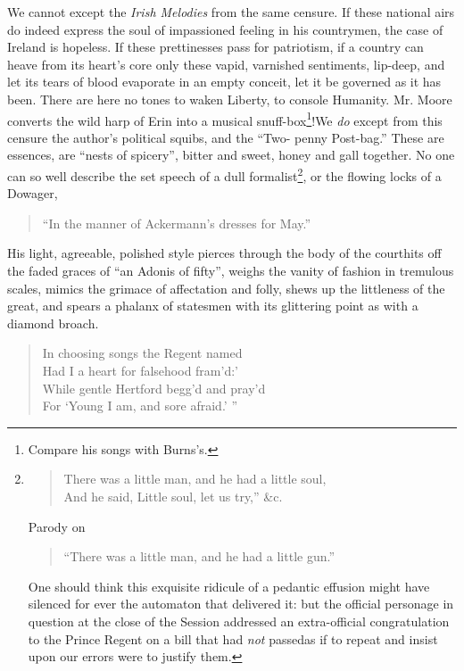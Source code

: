 We cannot except the \emph{Irish Melodies} from the same censure. If these
national airs do indeed express the soul of impassioned feeling in his
countrymen, the case of Ireland is hopeless. If these prettinesses pass
for patriotism, if a country can heave from its heart's core only these
vapid, varnished sentiments, lip-deep, and let its tears of blood
evaporate in an empty conceit, let it be governed as it has been. There
are here no tones to waken Liberty, to console Humanity. Mr. Moore
converts the wild harp of Erin into a musical snuff-box\footnote{Compare his songs with Burns's.}!\textemdash We \emph{do}
except from this censure the author's political squibs, and the ``Two-
penny Post-bag.'' These are essences, are ``nests of spicery'', bitter and
sweet, honey and gall together. No one can so well describe the set
speech of a dull formalist\footnote{\begin{verse}
  There was a little man, and he had a little soul,\\
  And he said, Little soul, let us try,'' \&c.\textemdash 
\end{verse}
Parody on
\begin{verse}
   ``There was a little man, and he had a little gun.''\textemdash 
\end{verse}
One should think this exquisite ridicule of a pedantic effusion might
have silenced for ever the automaton that delivered it: but the
official personage in question at the close of the Session addressed an
extra-official congratulation to the Prince Regent on a bill that had
\emph{not} passed\textemdash as if to repeat and insist upon our errors were to justify
them.}, or the flowing locks of a Dowager,
\begin{verse}
   ``In the manner of Ackermann's dresses for May.''
\end{verse}
His light, agreeable, polished style pierces through the body of the
court\textemdash hits off the faded graces of ``an Adonis of fifty'', weighs the
vanity of fashion in tremulous scales, mimics the grimace of affectation
and folly, shews up the littleness of the great, and spears a phalanx of
statesmen with its glittering point as with a diamond broach.
\begin{verse}
  In choosing songs the Regent named\\
  Had I a heart for falsehood fram'd:'\\
  While gentle Hertford begg'd and pray'd\\
  For `Young I am, and sore afraid.' ''
\end{verse}
